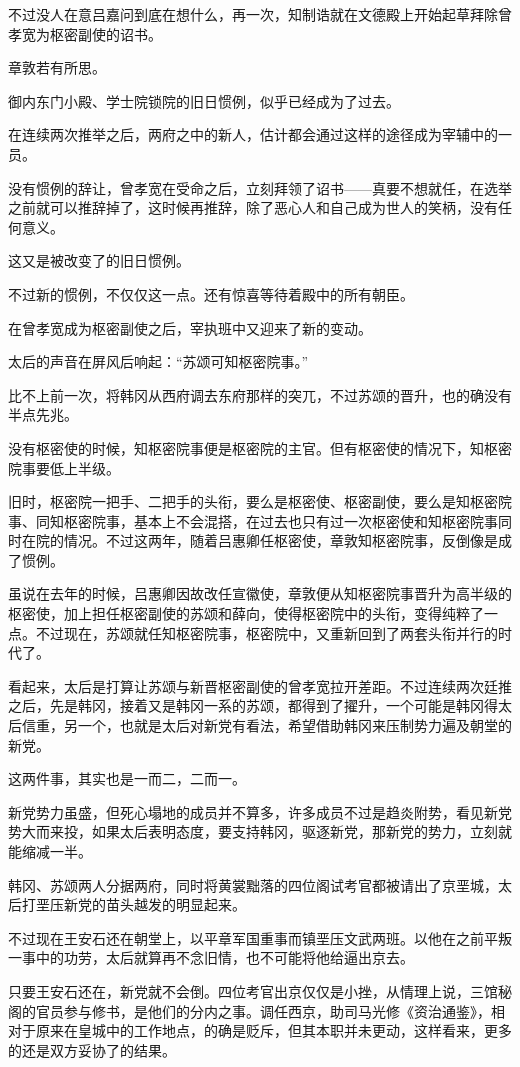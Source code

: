 不过没人在意吕嘉问到底在想什么，再一次，知制诰就在文德殿上开始起草拜除曾孝宽为枢密副使的诏书。

章敦若有所思。

御内东门小殿、学士院锁院的旧日惯例，似乎已经成为了过去。

在连续两次推举之后，两府之中的新人，估计都会通过这样的途径成为宰辅中的一员。

没有惯例的辞让，曾孝宽在受命之后，立刻拜领了诏书——真要不想就任，在选举之前就可以推辞掉了，这时候再推辞，除了恶心人和自己成为世人的笑柄，没有任何意义。

这又是被改变了的旧日惯例。

不过新的惯例，不仅仅这一点。还有惊喜等待着殿中的所有朝臣。

在曾孝宽成为枢密副使之后，宰执班中又迎来了新的变动。

太后的声音在屏风后响起：“苏颂可知枢密院事。”

比不上前一次，将韩冈从西府调去东府那样的突兀，不过苏颂的晋升，也的确没有半点先兆。

没有枢密使的时候，知枢密院事便是枢密院的主官。但有枢密使的情况下，知枢密院事要低上半级。

旧时，枢密院一把手、二把手的头衔，要么是枢密使、枢密副使，要么是知枢密院事、同知枢密院事，基本上不会混搭，在过去也只有过一次枢密使和知枢密院事同时在院的情况。不过这两年，随着吕惠卿任枢密使，章敦知枢密院事，反倒像是成了惯例。

虽说在去年的时候，吕惠卿因故改任宣徽使，章敦便从知枢密院事晋升为高半级的枢密使，加上担任枢密副使的苏颂和薛向，使得枢密院中的头衔，变得纯粹了一点。不过现在，苏颂就任知枢密院事，枢密院中，又重新回到了两套头衔并行的时代了。

看起来，太后是打算让苏颂与新晋枢密副使的曾孝宽拉开差距。不过连续两次廷推之后，先是韩冈，接着又是韩冈一系的苏颂，都得到了擢升，一个可能是韩冈得太后信重，另一个，也就是太后对新党有看法，希望借助韩冈来压制势力遍及朝堂的新党。

这两件事，其实也是一而二，二而一。

新党势力虽盛，但死心塌地的成员并不算多，许多成员不过是趋炎附势，看见新党势大而来投，如果太后表明态度，要支持韩冈，驱逐新党，那新党的势力，立刻就能缩减一半。

韩冈、苏颂两人分据两府，同时将黄裳黜落的四位阁试考官都被请出了京垩城，太后打垩压新党的苗头越发的明显起来。

不过现在王安石还在朝堂上，以平章军国重事而镇垩压文武两班。以他在之前平叛一事中的功劳，太后就算再不念旧情，也不可能将他给逼出京去。

只要王安石还在，新党就不会倒。四位考官出京仅仅是小挫，从情理上说，三馆秘阁的官员参与修书，是他们的分内之事。调任西京，助司马光修《资治通鉴》，相对于原来在皇城中的工作地点，的确是贬斥，但其本职并未更动，这样看来，更多的还是双方妥协了的结果。

